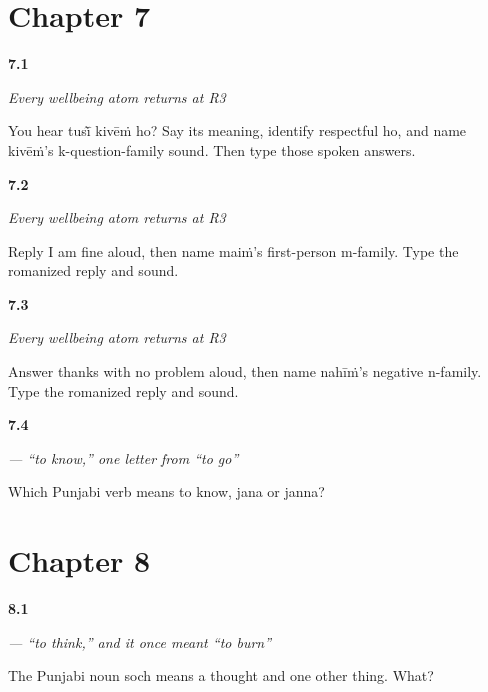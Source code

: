 \section*{Chapter 7}

\noindent\begin{minipage}[t]{\linewidth}
\raggedright
\hypertarget{review-PA-R07-wellbeing-r3-listening}{\textbf{7.1}} \emph{Every wellbeing atom returns at R3}\par
\small You hear tusī̃ kivēṁ ho? Say its meaning, identify respectful ho, and name kivēṁ's k-question-family sound. Then type those spoken answers.
\end{minipage}\par\medskip

\noindent\begin{minipage}[t]{\linewidth}
\raggedright
\hypertarget{review-PA-R07-wellbeing-r3-reply}{\textbf{7.2}} \emph{Every wellbeing atom returns at R3}\par
\small Reply I am fine aloud, then name maiṁ's first-person m-family. Type the romanized reply and sound.
\end{minipage}\par\medskip

\noindent\begin{minipage}[t]{\linewidth}
\raggedright
\hypertarget{review-PA-R07-wellbeing-r3-close}{\textbf{7.3}} \emph{Every wellbeing atom returns at R3}\par
\small Answer thanks with no problem aloud, then name nahīṁ's negative n-family. Type the romanized reply and sound.
\end{minipage}\par\medskip

\noindent\begin{minipage}[t]{\linewidth}
\raggedright
\hypertarget{review-PA-C07-janna-two-js}{\textbf{7.4}} \emph{ — “to know,” one letter from “to go”}\par
\small Which Punjabi verb means to know, jana or janna?
\end{minipage}\par\medskip

\section*{Chapter 8}

\noindent\begin{minipage}[t]{\linewidth}
\raggedright
\hypertarget{review-PA-C08-sochna-soch}{\textbf{8.1}} \emph{ — “to think,” and it once meant “to burn”}\par
\small The Punjabi noun soch means a thought and one other thing. What?
\end{minipage}\par\medskip

